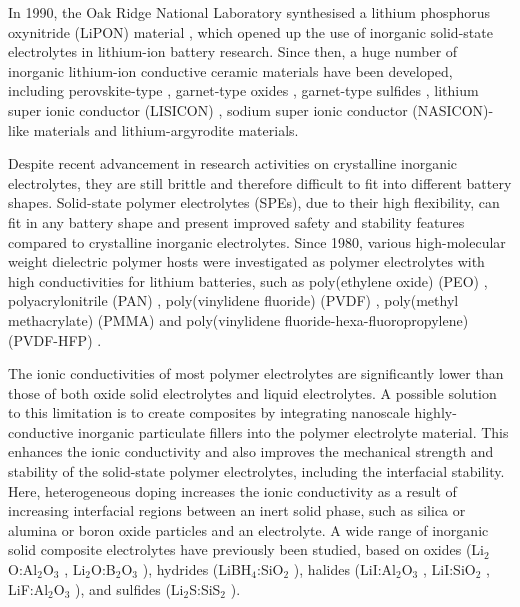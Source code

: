 \documentclass[../main.tex]{subfiles}
\begin{document}
In 1990, the Oak Ridge National Laboratory synthesised a lithium phosphorus oxynitride (LiPON) material \cite{dudney1992,bates1992}, which opened up the use of inorganic solid-state electrolytes in lithium-ion battery research. Since then, a huge number of inorganic lithium-ion conductive ceramic materials have been developed, including perovskite-type \cite{inaguma1993}, garnet-type oxides \cite{kasper1969,mazza1988}, garnet-type sulfides \cite{kennedy1986}, lithium super ionic conductor (LISICON) \cite{ivanov1988}, sodium super ionic conductor (NASICON)-like materials \cite{lang2015} and lithium-argyrodite materials. \cite{deklerk2016}

Despite recent advancement in research activities on crystalline inorganic electrolytes, they are still brittle and therefore difficult to fit into different battery shapes. Solid-state polymer electrolytes (SPEs), due to their high flexibility, can fit in any battery shape and present improved safety and stability features compared to crystalline inorganic electrolytes. \cite{DIRICAN201927} Since 1980, various high-molecular weight dielectric polymer hosts were investigated as polymer electrolytes with high conductivities for lithium batteries, such as poly(ethylene oxide) (PEO) \cite{fenton1973}, polyacrylonitrile (PAN) \cite{abraham1990,dautzenberg1994}, poly(vinylidene fluoride) (PVDF) \cite{arcella1999,kataoka2000,li2016}, poly(methyl methacrylate) (PMMA) \cite{appetecchi1995,bohnke1993} and poly(vinylidene fluoride-hexa-fluoropropylene) (PVDF-HFP) \cite{abbrent2001,park2008,yang2014}.

The ionic conductivities of most polymer electrolytes are significantly lower than those of both oxide solid electrolytes and liquid electrolytes. \cite{zhou2016} A possible solution to this limitation is to create composites by integrating nanoscale highly-conductive inorganic particulate fillers into the polymer electrolyte material. \cite{DIRICAN201927} This enhances the ionic conductivity and also improves the mechanical strength and stability of the solid-state polymer electrolytes, including the interfacial stability. \cite{D0SC03121F} Here, heterogeneous doping increases the ionic conductivity as a result of increasing interfacial regions between an inert solid phase, such as silica or alumina or boron oxide particles and an electrolyte. \cite{uvarov2011} A wide range of inorganic solid composite electrolytes have previously been studied, based on oxides (Li$_{2}$O:Al$_{2}$O$_{3}$ \cite{B300908D}, Li$_{2}$O:B$_{2}$O$_{3}$ \cite{Heitjans_2003,Indris2000,Indris2002}), hydrides (LiBH$_{4}$:SiO$_{2}$ \cite{blanchard2015}), halides (LiI:Al$_{2}$O$_{3}$ \cite{liang1973}, LiI:SiO$_{2}$ \cite{phipps1983}, LiF:Al$_{2}$O$_{3}$ \cite{uvarov1992}), and sulfides (Li$_{2}$S:SiS$_{2}$ \cite{pradel1986}). 
\end{document}
